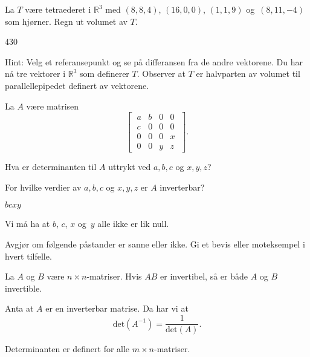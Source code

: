 \begin{oppgave}
La $T$ være tetraederet i $\mathbb{R}^3$ med $(8,8,4)$, $(16,0,0)$, $(1,1,9)$ og~$(8,11,-4)$ som hjørner. Regn ut volumet av $T$.
\end{oppgave}

\begin{losning}
430

\noindent
Hint: Velg et referansepunkt og se på differansen fra de andre vektorene. Du har nå tre vektorer i $\mathbb{R}^3$ som definerer $T$. Observer at $T$ er halvparten av volumet til parallellepipedet definert av vektorene. 
\end{losning}


\begin{oppgave}
La $A$ være matrisen \[
\begin{bmatrix}
\;a & b & 0 & 0\;\\
\;c & 0 & 0 & 0\;\\
\;0 & 0 & 0 & x\;\\
\;0 & 0 & y & z\;
\end{bmatrix}.
\]
\begin{punkt}
Hva er determinanten til $A$ uttrykt ved $a, b, c$ og $x, y, z$?
\end{punkt}

\begin{punkt}
For hvilke verdier av  $a, b, c$ og $x, y, z$ er $A$ inverterbar?
\end{punkt}
\end{oppgave}


\begin{losning}

\begin{punkt}
$bcxy$
\end{punkt}

\begin{punkt}
Vi må ha at $b$, $c$, $x$ og~$y$ alle ikke er lik null.
\end{punkt}

\end{losning}

\begin{oppgave}

Avgjør om følgende påstander er sanne eller ikke. Gi et bevis eller moteksempel i hvert tilfelle.

\begin{punkt}
La $A$ og $B$ være $n\times n$-matriser. Hvis $AB$ er invertibel, så er både $A$ og $B$ invertible.
\end{punkt}

\begin{punkt}
Anta at $A$ er en inverterbar matrise. Da har vi at $$\text{det}(A^{-1})=\frac{1}{\text{det}(A)}.$$
\end{punkt}

\begin{punkt}
Determinanten er definert for alle $m\times n$-matriser.
\end{punkt}

\end{oppgave}

